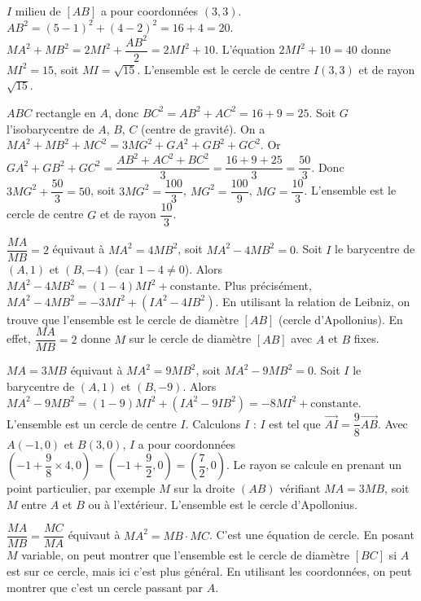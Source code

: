 $I$ milieu de $[AB]$ a pour coordonnées $(3,3)$. $AB^2 = (5-1)^2 + (4-2)^2 = 16 + 4 = 20$. $MA^2 + MB^2 = 2MI^2 + \dfrac{AB^2}{2} = 2MI^2 + 10$. L'équation $2MI^2 + 10 = 40$ donne $MI^2 = 15$, soit $MI = \sqrt{15}$. L'ensemble est le cercle de centre $I(3,3)$ et de rayon $\sqrt{15}$.

$ABC$ rectangle en $A$, donc $BC^2 = AB^2 + AC^2 = 16 + 9 = 25$. Soit $G$ l'isobarycentre de $A$, $B$, $C$ (centre de gravité). On a $MA^2 + MB^2 + MC^2 = 3MG^2 + GA^2 + GB^2 + GC^2$. Or $GA^2 + GB^2 + GC^2 = \dfrac{AB^2 + AC^2 + BC^2}{3} = \dfrac{16 + 9 + 25}{3} = \dfrac{50}{3}$. Donc $3MG^2 + \dfrac{50}{3} = 50$, soit $3MG^2 = \dfrac{100}{3}$, $MG^2 = \dfrac{100}{9}$, $MG = \dfrac{10}{3}$. L'ensemble est le cercle de centre $G$ et de rayon $\dfrac{10}{3}$.

$\dfrac{MA}{MB} = 2$ équivaut à $MA^2 = 4MB^2$, soit $MA^2 - 4MB^2 = 0$. Soit $I$ le barycentre de $(A,1)$ et $(B,-4)$ (car $1-4 \neq 0$). Alors $MA^2 - 4MB^2 = (1-4)MI^2 + \text{constante}$. Plus précisément, $MA^2 - 4MB^2 = -3MI^2 + (IA^2 - 4IB^2)$. En utilisant la relation de Leibniz, on trouve que l'ensemble est le cercle de diamètre $[AB]$ (cercle d'Apollonius). En effet, $\dfrac{MA}{MB} = 2$ donne $M$ sur le cercle de diamètre $[AB]$ avec $A$ et $B$ fixes.

$MA = 3MB$ équivaut à $MA^2 = 9MB^2$, soit $MA^2 - 9MB^2 = 0$. Soit $I$ le barycentre de $(A,1)$ et $(B,-9)$. Alors $MA^2 - 9MB^2 = (1-9)MI^2 + (IA^2 - 9IB^2) = -8MI^2 + \text{constante}$. L'ensemble est un cercle de centre $I$. Calculons $I$ : $I$ est tel que $\overrightarrow{AI} = \dfrac{9}{8}\overrightarrow{AB}$. Avec $A(-1,0)$ et $B(3,0)$, $I$ a pour coordonnées $\left(-1 + \dfrac{9}{8}\times 4, 0\right) = \left(-1 + \dfrac{9}{2}, 0\right) = \left(\dfrac{7}{2}, 0\right)$. Le rayon se calcule en prenant un point particulier, par exemple $M$ sur la droite $(AB)$ vérifiant $MA = 3MB$, soit $M$ entre $A$ et $B$ ou à l'extérieur. L'ensemble est le cercle d'Apollonius.

$\dfrac{MA}{MB} = \dfrac{MC}{MA}$ équivaut à $MA^2 = MB \cdot MC$. C'est une équation de cercle. En posant $M$ variable, on peut montrer que l'ensemble est le cercle de diamètre $[BC]$ si $A$ est sur ce cercle, mais ici c'est plus général. En utilisant les coordonnées, on peut montrer que c'est un cercle passant par $A$.

